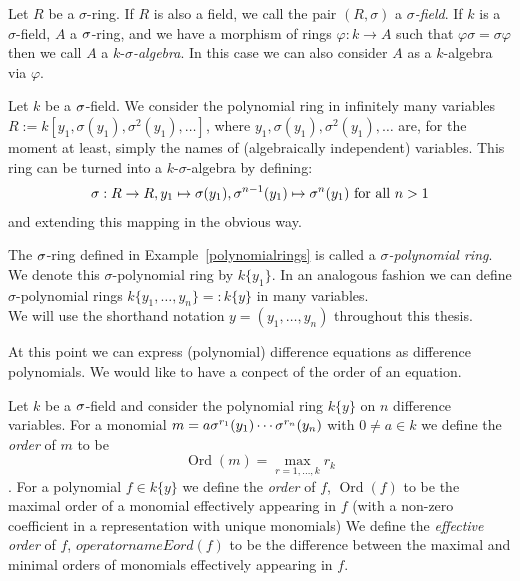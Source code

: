 \begin{defn}
Let $R$ be a $\sigma$-ring. If $R$ is also a field, we call the pair $(R,\sigma)$ a $\sigma$\emph{-field}.  
If $k$ is a $\sigma$-field, $A$ a $\sigma$-ring, and we have a morphism of rings $\varphi \colon k \rightarrow A$ such that $\varphi \sigma = \sigma \varphi$
 then we call $A$ a $k$-$\sigma$\emph{-algebra}.  In this case we can also consider $A$ as a $k$-algebra via $\varphi$.
\end{defn}

\begin{ex}\label{polynomialrings}
Let $k$ be a $\sigma$-field. We consider the polynomial ring in infinitely many variables $R:= k[y_1,\sigma(y_1),\sigma^2(y_1),\ldots]$,
 where $y_1,\sigma(y_1),\sigma^2(y_1),\ldots$ are, for the moment at least, simply the names of (algebraically independent) variables.
This ring can be turned into a $k$-$\sigma$-algebra by defining:
\begin{align*} 
\sigma:  R \rightarrow R, y_1 \mapsto \sigma(y_1), \sigma^{n-1}(y_1) \mapsto \sigma^{n}(y_1) \text{ for all } n > 1 
\end{align*}
and extending this mapping in the obvious way. 
\end{ex}

\begin{defn}
The $\sigma$-ring defined in Example~\ref{polynomialrings}  is called a $\sigma$\emph{-polynomial ring}. 
We denote this $\sigma$-polynomial ring by $k\{y_1\}$. In an analogous fashion we can define $\sigma$-polynomial rings $k\{y_1, \ldots, y_n \} =: k\{y\}$ in many variables. \\
We will use the shorthand notation $y = (y_1,\ldots,y_n)$ throughout this thesis.
\end{defn}

At this point we can express (polynomial) difference equations as difference polynomials. We would like to have a conpect of the order of an equation.
\begin{defn}
Let $k$ be a $\sigma$-field and consider the polynomial ring $k\{y\}$ on $n$ difference variables. For a monomial $m = a \sigma^{r_1}(y_1) \cdots \sigma^{r_n}(y_n)$ with $0 \neq a \in k$ we define the \emph{order}  of $m$ to be
$$\operatorname{Ord}(m) = \max_{r = 1, \ldots, k} r_k $$. For a polynomial $f \in k\{y\}$ we define the \emph{order} of $f$, $\operatorname{Ord}(f)$ to be the maximal order of a monomial effectively appearing in $f$ (with a non-zero coefficient in a representation with unique monomials)
 We define the \emph{effective order} of $f$, $operatorname{Eord}(f)$ to be the difference between the maximal and minimal orders of monomials effectively appearing in $f$.
\end{defn}

